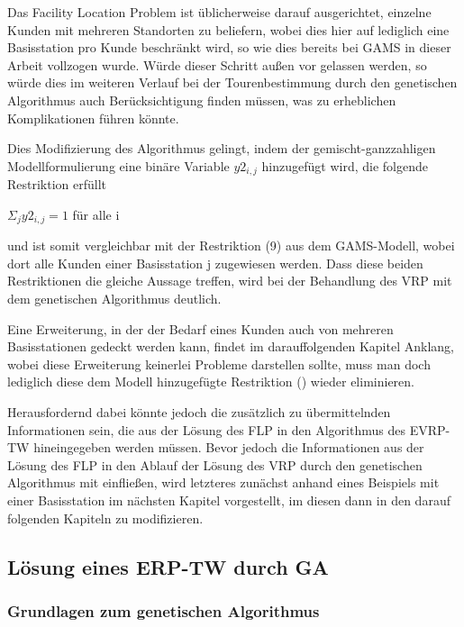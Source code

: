 \documentclass[a4paper,12pt,parskip,bibtotoc,liststotoc]{article}
\begin{document}
Das Facility Location Problem ist üblicherweise darauf ausgerichtet, einzelne Kunden mit mehreren Standorten zu beliefern, wobei dies hier auf lediglich eine Basisstation pro Kunde beschränkt wird, so wie dies bereits bei GAMS in dieser Arbeit vollzogen wurde.
Würde dieser Schritt außen vor gelassen werden, so würde dies im weiteren Verlauf bei der Tourenbestimmung durch den genetischen Algorithmus auch Berücksichtigung finden müssen, was zu erheblichen Komplikationen führen könnte.

Dies Modifizierung des Algorithmus gelingt, indem der gemischt-ganzzahligen Modellformulierung eine binäre Variable $y2_{i,j}$ hinzugefügt wird, die folgende Restriktion erfüllt

\begin{center}

$\Sigma_{j} y2_{i,j} = 1$ für alle i

\end{center}

und ist somit vergleichbar mit der Restriktion (9) aus dem GAMS-Modell, wobei dort alle Kunden einer Basisstation j zugewiesen werden.
Dass diese beiden Restriktionen die gleiche Aussage treffen, wird bei der Behandlung des VRP mit dem genetischen Algorithmus deutlich.

Eine Erweiterung, in der der Bedarf eines Kunden auch von mehreren Basisstationen gedeckt werden kann, findet im darauffolgenden Kapitel Anklang, wobei diese Erweiterung keinerlei Probleme darstellen sollte, muss man doch lediglich diese dem Modell hinzugefügte Restriktion () wieder eliminieren.

Herausfordernd dabei könnte jedoch die zusätzlich zu übermittelnden Informationen sein, die aus der Lösung des FLP in den Algorithmus des EVRP-TW hineingegeben werden müssen.
Bevor jedoch die Informationen aus der Lösung des FLP in den Ablauf der Lösung des VRP durch den genetischen Algorithmus mit einfließen, wird letzteres zunächst anhand eines Beispiels mit einer Basisstation im nächsten Kapitel vorgestellt, im diesen dann in den darauf folgenden Kapiteln zu modifizieren.


\subsection{Lösung eines ERP-TW durch GA}

\subsubsection{Grundlagen zum genetischen Algorithmus}
\end{document}
